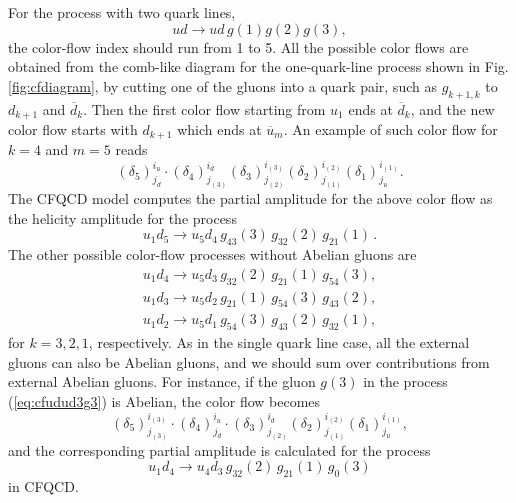 For the process with two quark lines,
\begin{equation}
 ud\rightarrow ud\,g(1)g(2)g(3),
  \label{eq:ududg3}
\end{equation}
 the color-flow index should run from 1 to 5.
All the possible color flows are obtained from the comb-like diagram for
the one-quark-line process shown in Fig.\,\ref{fig:cfdiagram}, by cutting
one of the gluons into a quark pair, such as $g_{k+1,k}$ to $d_{k+1}$
and $\overline{d}_k$. Then the first color flow starting from $u_1$ ends at $\overline{d}_k$, and
the new color flow starts with $d_{k+1}$ which ends at
$\overline{u}_m$. An example of such color flow for $k=4$ and $m=5$ reads
\begin{equation}
 (\delta_5)^{i_u}_{j_d}\cdot(\delta_4)^{i_d}_{j_{(3)}}(\delta_3)^{i_{(3)}}_{j_{(2)}}
(\delta_2)^{i_{(2)}}_{j_{(1)}}(\delta_1)^{i_{(1)}}_{j_u}.
\end{equation}
The CFQCD model computes the partial amplitude for the above color flow
as the helicity amplitude for the process
\begin{equation}
u_1d_5\rightarrow u_5d_4\,g_{43}(3)\,g_{32}(2)\,g_{21}(1)\,.
\end{equation}
The other possible color-flow processes without Abelian gluons are
\begin{align}
u_1d_4\rightarrow u_5d_3\,g_{32}(2)\,g_{21}(1)\,g_{54}(3),\label{eq:cfudud3g3}\\
u_1d_3\rightarrow u_5d_2\,g_{21}(1)\,g_{54}(3)\,g_{43}(2),\\
u_1d_2\rightarrow u_5d_1\,g_{54}(3)\,g_{43}(2)\,g_{32}(1),
\end{align}
for $k=3,2,1$, respectively. As in the single quark line case, all the
external gluons can also be Abelian gluons, and we should sum over
contributions from external Abelian gluons. For instance, if the
gluon $g(3)$ in the process (\ref{eq:cfudud3g3}) is Abelian, the color flow becomes
\begin{equation}
 (\delta_5)^{i_{(3)}}_{j_{(3)}}\cdot (\delta_4)^{i_u}_{j_d}\cdot
  (\delta_3)^{i_d}_{j_{(2)}}(\delta_2)^{i_{(2)}}_{j_{(1)}}
  (\delta_1)^{i_{(1)}}_{j_u},
\end{equation}
and the corresponding partial amplitude is calculated for the process
\begin{equation}
u_1d_4\rightarrow u_4d_3\,g_{32}(2)\,g_{21}(1)\,g_0(3)
\end{equation}
in CFQCD.

